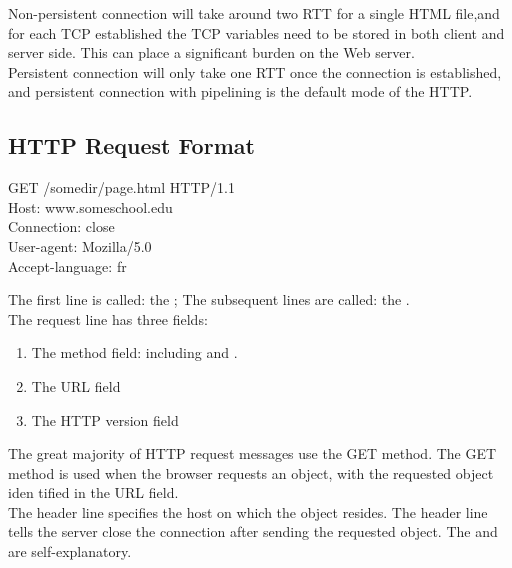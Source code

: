
Non-persistent connection will take around two RTT for a single HTML file,and for each TCP established the TCP
variables need to be stored in both client and server side. This can place a significant burden on the Web server.\\

Persistent connection will only take one RTT once the connection is
established, and persistent connection with pipelining is the default mode of the HTTP.


\subsection{HTTP Request Format}

\hf
\begin{center}
    GET /somedir/page.html HTTP/1.1\\
    Host: www.someschool.edu\\
    Connection: close\\
    User-agent: Mozilla/5.0\\
    Accept-language: fr
    \label{c2_http_request}
\end{center}

The first line is called: the ;
The subsequent lines are called: the .\\
The request line has three fields:
\begin{enumerate}
    \item The method field: including  and .
    \item The URL field
    \item The HTTP version field
\end{enumerate}

The great majority of HTTP request messages use the GET method. The GET
method is used when the browser requests an object, with the requested object iden tified in the URL field.\\

The header line  specifies the host on which the object resides. The header line 
tells the server close the connection after sending the requested object. The  and  are self-explanatory.\\

\newpage


